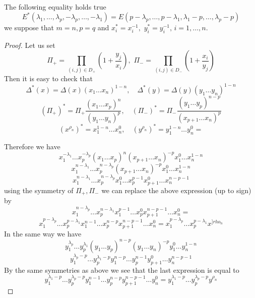 \documentclass[10pt,a4paper]{amsart}
\begin{document}
\begin{lemma} The following equality holds true
$$
E^*(\lambda_1,\dots,\lambda_p, -\lambda_p,\dots,-\lambda_1)=E(p-\lambda_p,\dots,p-\lambda_1, \lambda_1-p,\dots,\lambda_p-p)
$$
we suppose that $m=n, p=q$ and $x_i^*=x_i^{-1},\,\,y_i^*=y_i^{-1},\,i=1,\dots, n$.
\end{lemma}

\begin{proof} Let us set
$$
\Pi_+=\prod_{(i,j)\in D_{+}}\left(1+\frac{y_j}{x_i}\right),\,\,\Pi_-=\prod_{(i,j)\in D_{-}}\left(1+\frac{x_i}{y_j}\right)
$$
Then it is easy to check that 
$$
\Delta^*(x)=\Delta(x)(x_1\dots x_n)^{1-n},\quad \Delta^*(y)=\Delta(y)(y_1\dots y_n)^{1-n}
$$
$$
(\Pi_+)^*=\Pi_+\frac{(x_1\dots x_p)^n}{(y_1\dots y_n)^p},\quad (\Pi_-)^*=\Pi_-\frac{(y_1\dots y_p)^{n-p}}{(x_{p+1}\dots x_n)^p}
$$
$$
(x^{\rho_n})^*=x_1^{1-n}\dots x_n^{0},\quad (y^{\rho_n})^*=y_1^{1-n}\dots y_n^{0}=
$$

Therefore we have 
$$
x_1^{-\lambda_1}\dots x_p^{-\lambda_p}(x_1\dots x_p)^{n}(x_{p+1}\dots x_n)^{-p}x_1^0\dots x_n^{1-n}
$$
$$
x_1^{n-\lambda_1}\dots x_p^{n-\lambda_p}(x_{p+1}\dots x_n)^{-p}x_1^0\dots x_n^{1-n}
$$
$$
x_1^{n-\lambda_1}\dots x_p^{n-\lambda_p}x_1^0\dots x_p^{p-1}x_{p+1}^0\dots x_n^{n-p-1}
$$
using the symmetry of $\Pi_+,\Pi_-$  we can replace the above expression (up to sign) by 
$$
x_1^{n-\lambda_p}\dots x_p^{n-\lambda_1}x_1^{p-1}\dots x_p^{0}x_{p+1}^{n-p-1}\dots x_n^{0}=
$$
$$
x_1^{p-\lambda_p}\dots x_p^{p-\lambda_1}x_1^{n-1}\dots x_p^{n-p}x_{p+1}^{n-p-1}\dots x_n^{0}=x_1^{p-\lambda_p}\dots x_p^{p-\lambda_1}x^{]rho_n}
$$
In the same way we have 
$$
y_1^{\lambda_p}\dots y_p^{\lambda_1}(y_1\dots y_p)^{n-p}(y_{1}\dots y_n)^{-p}y_1^0\dots y_n^{1-n}
$$
$$
y_1^{\lambda_p-p}\dots y_p^{\lambda_1-p}y_1^{n-p}\dots y_p^{n-1}y_{p+1}^0\dots y_n^{n-p-1}
$$
By the same symmetries as above we see that  the last expression is equal to
$$
y_1^{\lambda_1-p}\dots y_p^{\lambda_p-p}y_1^{n-1}\dots y_p^{n-p}y_{p+1}^{n-p-1}\dots y_n^{0}=y_1^{\lambda_1-p}\dots y_p^{\lambda_p-p}y^{\rho_n}
$$
\end{proof}
\end{document}

